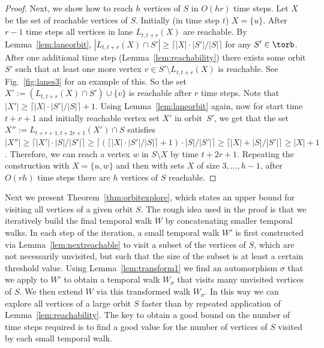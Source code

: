 {\begin{proof}
    Next, we show how to reach $h$ vertices of $S$ in $O(hr)$ time steps.
        Let $X$ be the set of reachable vertices
        of $S$. Initially (in time step $t$) $X=\{u\}$. After $r-1$ time steps
        all vertices in lane $L_{t, t+r}(X)$ are reachable. By
        Lemma~\ref{lem:laneorbit}, $|L_{t, t+r}(X)\cap S'|\geq \lceil |X| \cdot
        |S'|/|S| \rceil$ for any $S' \in \torb$. %
        After one additional time step (Lemma~\ref{lem:reachability}) there
        exists some orbit $S'$ such that at least one more vertex $v \in
        S'\setminus L_{t, t+r}(X)$ is reachable. {See
        Fig.~\ref{fig:lanes3} for an example of this.} So the set $X' :=
        (L_{t, t+r}(X) \cap S')\cup \{v\}$ is reachable after $r$ time steps.
        Note that $|X'| \geq \lceil |X| \cdot |S'|/|S| \rceil + 1$. Using
        Lemma~\ref{lem:laneorbit} again, now for start time $t+r+1$ and
        initially reachable vertex set $X'$ in orbit~$S'$, we get that the set
        $X'':= L_{t+r+1, t+2r+1}(X') \cap S$ satisfies $|X''| \geq \lceil |X'|
        \cdot |S|/|S'| \rceil \geq \lceil( \lceil|X| \cdot |S'|/|S|\rceil+1)
        \cdot |S|/|S'|\rceil \geq \lceil |X| + |S|/|S'| \rceil \ge |X|+1$.
        Therefore, we can reach a vertex $w$ in $S \setminus X$ by time
        $t+2r+1$. Repeating the construction with $X=\{u, w\}$ and then with
        sets $X$ of size $3, \ldots, h-1$, after $O(rh)$ time steps there are
        $h$ vertices of $S$ reachable.
\end{proof}
}
\full{\proofnextreachable}


    Next we present Theorem~\ref{thm:orbitexplore}, which states an upper bound
    for visiting all vertices of a given orbit $S$. The rough idea used in the
    proof is that we iteratively build the final temporal walk $W$ by
    concatenating smaller temporal walks. In each step of the iteration, a small
    temporal walk $W'$ is first constructed via Lemma~\ref{lem:nextreachable} to
    visit a subset of the vertices of $S$, which are not necessarily unvisited,
    but such that the size of the subset is at least a certain threshold value.
    Using Lemma~\ref{lem:transform1} we find an automorphism $\sigma$ that we
    apply to $W'$ to obtain a temporal walk $W_{\sigma}$ that visits many
    unvisited vertices of $S$. We then extend $W$ via this transformed walk
    $W_{\sigma}$. In this way we can explore all vertices of a large orbit $S$ faster
    than by repeated application of Lemma~\ref{lem:reachability}. The key to
    obtain a good bound on the number of time steps required is to find a good
    value for the number of vertices of $S$ visited by each small temporal walk.


